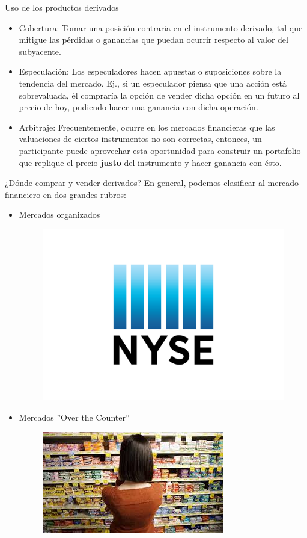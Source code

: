 \documentclass[11pt]{beamer}
\begin{document}
\begin{frame}{Uso de los productos derivados}
	
	\begin{itemize}
		\justifying
		\item Cobertura:
		Tomar una posición contraria en el instrumento derivado, tal que mitigue las pérdidas o ganancias que puedan ocurrir respecto al valor del subyacente.

		
		\item Especulación:
		Los especuladores hacen apuestas o suposiciones sobre la tendencia del mercado. Ej., si un especulador piensa que una acción está sobrevaluada, él compraría la opción de vender dicha opción en un futuro al precio de hoy, pudiendo hacer una ganancia con dicha operación.
		\item Arbitraje: Frecuentemente, ocurre en los mercados financieras que las valuaciones de ciertos instrumentos no son correctas, entonces, un participante puede aprovechar esta oportunidad para construir un portafolio que replique el precio \textbf{justo} del instrumento y hacer ganancia con ésto.
	\end{itemize}
\end{frame}

\begin{frame}{¿Dónde comprar y vender derivados?}
	En general, podemos clasificar al mercado financiero en dos grandes rubros:
	\begin{itemize}
		\item Mercados organizados
		\begin{figure}
			
			\includegraphics[width=0.3\linewidth]{NYSE-logo-2014}
			
		\end{figure}
		
		\item Mercados ''Over the Counter''
		\begin{figure}

			\includegraphics[width=0.3\linewidth]{over_the_counter}

		\end{figure}
		
		
		
	\end{itemize}
\end{frame}
\end{document}
